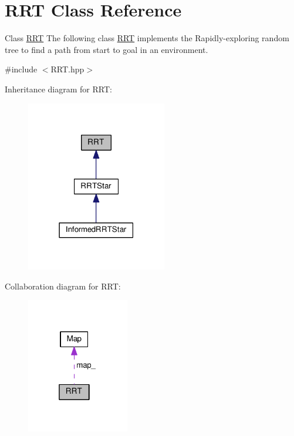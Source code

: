 \hypertarget{classRRT}{}\section{R\+RT Class Reference}
\label{classRRT}


Class \hyperlink{classRRT}{R\+RT} The following class \hyperlink{classRRT}{R\+RT} implements the Rapidly-\/exploring random tree to find a path from start to goal in an environment.  




{\ttfamily \#include $<$R\+R\+T.\+hpp$>$}



Inheritance diagram for R\+RT\+:
\nopagebreak
\begin{figure}[H]
\begin{center}
\leavevmode
\includegraphics[width=174pt]{classRRT__inherit__graph}
\end{center}
\end{figure}


Collaboration diagram for R\+RT\+:
\nopagebreak
\begin{figure}[H]
\begin{center}
\leavevmode
\includegraphics[width=127pt]{classRRT__coll__graph}
\end{center}
\end{figure}
